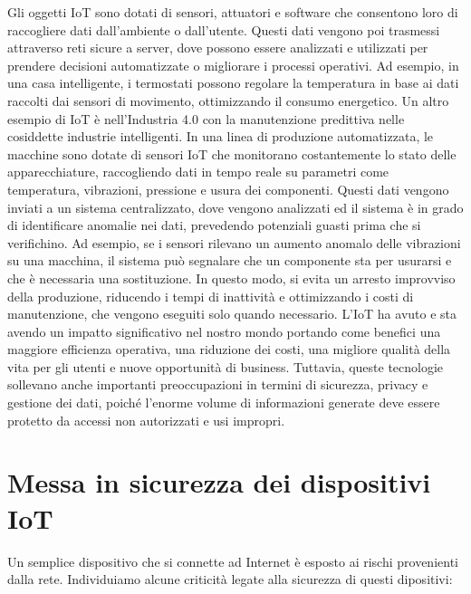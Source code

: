 Gli oggetti IoT sono dotati di sensori, attuatori e software che consentono loro di raccogliere dati dall'ambiente o dall'utente. Questi dati vengono poi trasmessi attraverso reti sicure a server, dove possono essere analizzati e utilizzati per prendere decisioni automatizzate o migliorare i processi operativi. Ad esempio, in una casa intelligente, i termostati possono regolare la temperatura in base ai dati raccolti dai sensori di movimento, ottimizzando il consumo energetico.  \cite{riskAnalysis}
Un altro esempio di IoT è nell'Industria 4.0 con la manutenzione predittiva nelle cosiddette industrie intelligenti.
In una linea di produzione automatizzata, le macchine sono dotate di sensori IoT che monitorano costantemente lo stato delle apparecchiature, raccogliendo dati in tempo reale su parametri come temperatura, vibrazioni, pressione e usura dei componenti. Questi dati vengono inviati a un sistema centralizzato, dove vengono analizzati ed il sistema è in grado di identificare anomalie nei dati, prevedendo potenziali guasti prima che si verifichino. 
Ad esempio, se i sensori rilevano un aumento anomalo delle vibrazioni su una macchina, il sistema può segnalare che un componente sta per usurarsi e che è necessaria una sostituzione. In questo modo, si evita un arresto improvviso della produzione, riducendo i tempi di inattività e ottimizzando i costi di manutenzione, che vengono eseguiti solo quando necessario. \cite{predictiveMaintenance}
L'IoT ha avuto e sta avendo un impatto significativo nel nostro mondo portando come benefici una maggiore efficienza operativa, una riduzione dei costi, una migliore qualità della vita per gli utenti e nuove opportunità di business. Tuttavia, queste tecnologie sollevano anche importanti preoccupazioni in termini di sicurezza, privacy e gestione dei dati, poiché l'enorme volume di informazioni generate deve essere protetto da accessi non autorizzati e usi impropri.

\section{Messa in sicurezza dei dispositivi IoT}

Un semplice dispositivo che si connette ad Internet è esposto ai rischi provenienti dalla rete. Individuiamo alcune criticità legate alla sicurezza di questi dipositivi:

